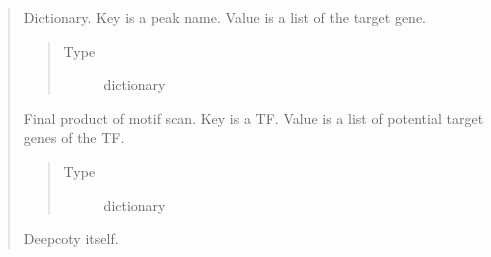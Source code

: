 \documentclass[letterpaper,10pt,english]{sphinxmanual}
\begin{document}
\begin{quote}
\begin{fulllineitems}
\begin{fulllineitems}
\begin{quote}
\begin{description}
\end{description}\end{quote}

\end{fulllineitems}


\begin{fulllineitems}
\label{\detokenize{modules/celloracle.motif_analysis:celloracle.motif_analysis.TFinfo.dic_peak2Targetgene}}
Dictionary. Key is a peak name. Value is a list of the target gene.
\begin{quote}\begin{description}
\item[{Type}] \leavevmode
dictionary

\end{description}\end{quote}

\end{fulllineitems}


\begin{fulllineitems}
\label{\detokenize{modules/celloracle.motif_analysis:celloracle.motif_analysis.TFinfo.dic_TF2targetgenes}}
Final product of motif scan. Key is a TF. Value is a list of potential target genes of the TF.
\begin{quote}\begin{description}
\item[{Type}] \leavevmode
dictionary

\end{description}\end{quote}

\end{fulllineitems}


\begin{fulllineitems}
\label{\detokenize{modules/celloracle.motif_analysis:celloracle.motif_analysis.TFinfo.copy}}
Deepcoty itself.


\end{fulllineitems}
\end{fulllineitems}
\end{quote}
\end{document}
